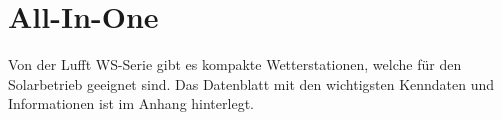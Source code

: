\section{All-In-One}
Von der Lufft WS-Serie gibt es kompakte Wetterstationen, welche für den Solarbetrieb geeignet sind. Das Datenblatt mit den wichtigsten Kenndaten und Informationen ist im Anhang hinterlegt.